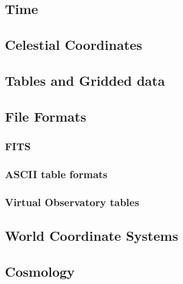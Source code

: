 \documentclass[12pt,preprint]{aastex}
\begin{document}


\subsection{Time}



\subsection{Celestial Coordinates}



\subsection{Tables and Gridded data}



\subsection{File Formats}


\subsubsection{FITS}



\subsubsection{ASCII table formats}



\subsubsection{Virtual Observatory tables}



\subsection{World Coordinate Systems}



\subsection{Cosmology}
\end{document}
